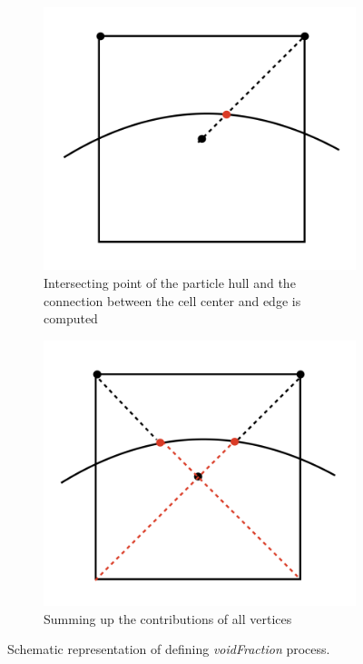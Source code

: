 \begin{figure}[!ht]
\begin{subfigure}[b]{0.47\textwidth}
        \includegraphics[width=\textwidth]{Images/chap3/3.png}
        \caption{Intersecting point of the particle hull and the connection between the cell center and edge is computed}
    \end{subfigure}
    \hfill
    \begin{subfigure}[b]{0.47\textwidth}
        \includegraphics[width=\textwidth]{Images/chap3/4.png}
        \caption{Summing up the contributions of all vertices}
    \end{subfigure}
    \caption{Schematic representation of defining \textit{voidFraction} process.}
\end{figure}
